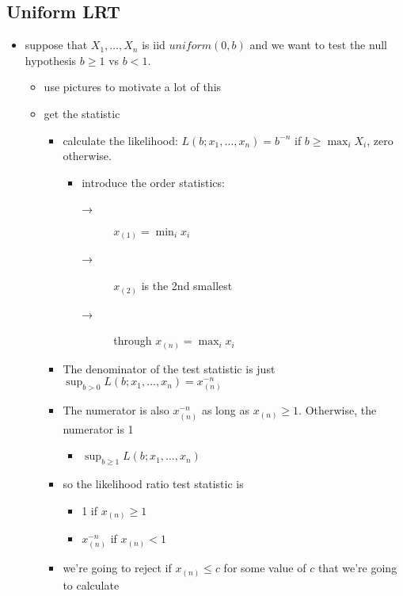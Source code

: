 \documentclass[11pt]{article}
\begin{document}
\subsection{Uniform LRT}
\label{sec-2-1}

\begin{itemize}
\item suppose that $X_1,\dots,X_n$ is iid $uniform(0,b)$ and we want
      to test the null hypothesis $b \geq 1$ vs $b < 1$.
\begin{itemize}
\item use pictures to motivate a lot of this
\item get the statistic
\begin{itemize}
\item calculate the likelihood: $L(b; x_1,\dots,x_n) = b^{-n}$ if
          $b \geq \max_i X_i$, zero otherwise.
\begin{itemize}
\item introduce the order statistics:
\begin{description}
\item[→] $x_{(1)} = \min_i x_i$
\item[→] $x_{(2)}$ is the 2nd smallest
\item[→] through $x_{(n)} = \max_i x_i$
\end{description}
\end{itemize}
\item The denominator of the test statistic is just $\sup_{b >
          0} L(b; x_1,\dots,x_n) = x_{(n)}^{-n}$
\item The numerator is also $x_{(n)}^{-n}$ as long as $x_{(n)}
          \geq 1$.  Otherwise, the numerator is 1
\begin{itemize}
\item $\sup_{b \geq 1} L(b; x_1,\dots,x_n)$
\end{itemize}
\item so the likelihood ratio test statistic is
\begin{itemize}
\item 1 if $x_{(n)} \geq 1$
\item $x_{(n)}^{-n}$ if $x_{(n)} < 1$
\end{itemize}
\item we're going to reject if $x_{(n)} \leq c$ for some value of
          $c$ that we're going to calculate
\end{itemize}
\end{itemize}
\end{itemize}
\end{document}
